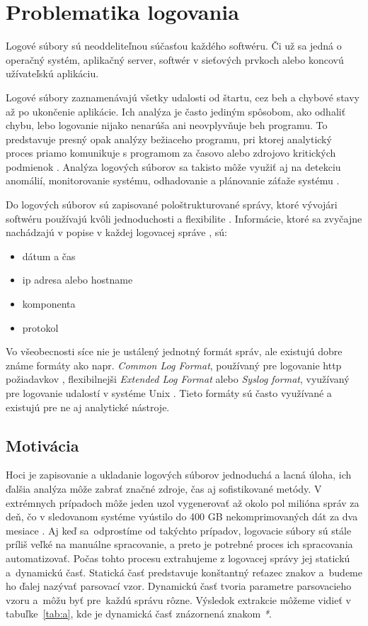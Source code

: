 \chapter{Problematika logovania}

Logové súbory sú neoddeliteľnou súčasťou každého softwéru. Či už sa jedná o operačný systém, aplikačný server, softwér v sieťových prvkoch alebo koncovú užívateľskú aplikáciu. 
\par Logové súbory zaznamenávajú všetky udalosti od štartu, cez beh a chybové stavy až po ukončenie aplikácie. Ich analýza je často je\-diným spôsobom, ako odhaliť chybu, lebo logovanie nijako nenarúša ani neovplyvňuje beh programu. To predstavuje presný opak analýzy bežiaceho programu, pri ktorej analytický proces priamo komunikuje s programom za časovo alebo zdrojovo kritických podmienok  \parencite{jvaldman}. Analýza logových súborov sa takisto môže využiť aj na detekciu anomálií, monitorovanie systému, odhadovanie a plánovanie záťaže systému \parencite{logengineering}.
\par Do logových súborov sú zapisované pološtrukturované správy, ktoré vývojári softwéru používajú kvôli jednoduchosti a flexibilite \parencite{he2016, ibm}. Informácie, ktoré sa zvyčajne nachádzajú v popise v každej logovacej správe \parencite{weblog, datapreprocessing, sshd}, sú:
\begin{itemize}
  \item dátum a čas
  \item ip adresa alebo hostname
  \item komponenta
  \item protokol
\end{itemize}
\par Vo všeobecnosti síce nie je ustálený jednotný formát správ, ale existujú dobre známe formáty ako napr. \emph{Common Log Format}, používaný pre logovanie http požiadavkov \parencite{CLF} , flexibilnejši \emph{Extended Log Format} \parencite{ELF} alebo \emph{Syslog format}, využívaný pre logovanie udalostí v systéme Unix \parencite{syslog}. Tieto formáty sú často využívané a existujú pre ne aj analytické nástroje. \

\section{Motivácia}

\par Hoci je zapisovanie a ukladanie logových súborov jednoduchá a lacná úloha, ich ďalšia analýza môže zabrať značné zdroje, čas aj sofistikované metódy. V extrémnych prípadoch môže jeden uzol vygenerovať až okolo pol milióna správ za deň, čo v sledovanom systéme vyústilo do 400 GB nekomprimovaných dát za dva mesiace \parencite{google}. Aj keď sa~od\-pros\-tíme od takýchto prípadov, logovacie súbory sú stále príliš veľké na manuálne spracovanie, a preto je potrebné proces ich spracovania automatizovať. Počas tohto procesu extrahujeme z logovacej správy jej statickú a~dynamickú časť. Statická časť predstavuje konštantný reťazec znakov a~budeme ho ďalej nazývať parsovací vzor. Dyna\-mickú časť tvoria parametre parsovacieho vzoru a~môžu byť pre~každú správu rôzne. Výsledok extrakcie môžeme vidieť v tabuľke~\ref{tab:a}, kde je dynamická časť znázornená znakom \emph{*}. 

